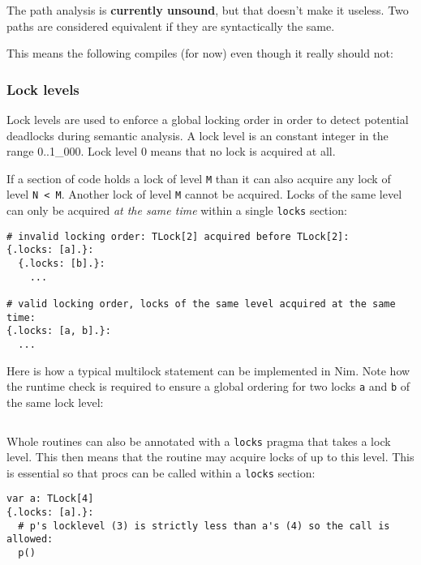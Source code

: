 The path analysis is \textbf{currently unsound}, but that doesn't make
it useless. Two paths are considered equivalent if they are
syntactically the same.

This means the following compiles (for now) even though it really should
not:

\begin{Shaded}
\begin{Highlighting}[]

\end{Highlighting}
\end{Shaded}

\hypertarget{lock-levels}{%
\subsubsection{Lock levels}\label{lock-levels}}

Lock levels are used to enforce a global locking order in order to
detect potential deadlocks during semantic analysis. A lock level is an
constant integer in the range 0..1\_000. Lock level 0 means that no lock
is acquired at all.

If a section of code holds a lock of level \texttt{M} than it can also
acquire any lock of level \texttt{N\ \textless{}\ M}. Another lock of
level \texttt{M} cannot be acquired. Locks of the same level can only be
acquired \emph{at the same time} within a single \texttt{locks} section:

\begin{verbatim}
# invalid locking order: TLock[2] acquired before TLock[2]:
{.locks: [a].}:
  {.locks: [b].}:
    ...

# valid locking order, locks of the same level acquired at the same time:
{.locks: [a, b].}:
  ...
\end{verbatim}

Here is how a typical multilock statement can be implemented in Nim.
Note how the runtime check is required to ensure a global ordering for
two locks \texttt{a} and \texttt{b} of the same lock level:

\begin{verbatim}
\end{verbatim}

Whole routines can also be annotated with a \texttt{locks} pragma that
takes a lock level. This then means that the routine may acquire locks
of up to this level. This is essential so that procs can be called
within a \texttt{locks} section:

\begin{verbatim}
var a: TLock[4]
{.locks: [a].}:
  # p's locklevel (3) is strictly less than a's (4) so the call is allowed:
  p()
\end{verbatim}

